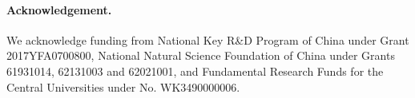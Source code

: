 \documentclass[10pt,twocolumn,letterpaper]{article}
\begin{document}
\paragraph{Acknowledgement.}
We acknowledge funding from National Key R\&D Program of China under Grant 2017YFA0700800, National Natural Science Foundation of China under Grants 61931014, 62131003 and 62021001, and Fundamental Research Funds for the Central Universities under No. WK3490000006.





\small
\normalem


\end{document}
